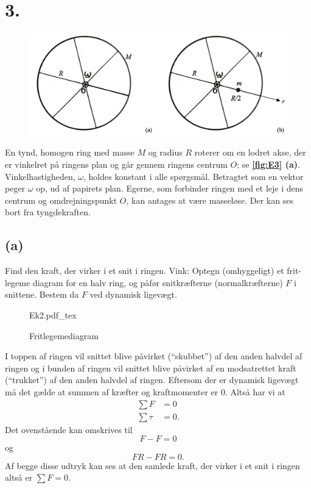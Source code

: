 \documentclass[12pt]{article}
\newcommand{\incfig}[2][1]{%
  \def\svgwidth{#1\columnwidth}
  {#2.pdf_tex}
}
\theoremstyle{definition}
\begin{document}
\section*{3.}
\begin{figure} [ht]
  \centering
  \caption{}
  \includegraphics[width=0.5\linewidth]{../figures/E3.png}
  \label{fig:E3}
\end{figure}

En tynd, homogen ring med masse $M$ og radius $R$ roterer om en lodret akse, der er vinkelret på ringens plan og går gennem ringens centrum $O$; se \textbf{\autoref{fig:E3} (a)}. Vinkelhastigheden, $\omega$, holdes konstant i alle spørgsmål. Betragtet som en vektor peger $\omega$ op, ud af papirets plan. Egerne, som forbinder ringen med et leje i dens centrum og omdrejningspunkt $O$, kan antages at være masseløse. Der kan ses bort fra tyngdekraften. 

\subsection*{(a)}
Find den kraft, der virker i et snit i ringen.
Vink: Optegn (omhyggeligt) et frit-legeme diagram for en halv ring, og påfør snitkræfterne (normalkræfterne) $F$ i snittene. Bestem da $F$ ved dynamisk ligevægt.
\bigbreak
\begin{figure}[ht]
  \centering
  \incfig[0.3]{Ek2}
  \caption{Fritlegemediagram}
  \label{fig:Ek2}
\end{figure}
I toppen af ringen vil snittet blive påvirket (``skubbet'') af den anden halvdel af ringen og i bunden af ringen vil snittet blive påvirket af en modsatrettet kraft (``trukket'') af den anden halvdel af ringen. Eftersom der er dynamisk ligevægt må det gælde at summen af kræfter og kraftmomenter er 0. Altså har vi at
\begin{align*}
  \sum F &= 0 \\
  \sum \tau &= 0
.\end{align*}
Det ovenstående kan omskrives til
\[ 
F - F = 0 
\]
og
\[ 
F R - FR = 0
.\]
Af begge disse udtryk kan ses at den samlede kraft, der virker i et snit i ringen altså er \underline{\underline{$\sum F = 0$}}.
\end{document}
